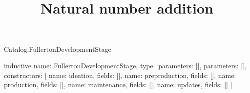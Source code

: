 \begin{lexlean}{Catalog.FullertonDevelopmentStage}
\title{Natural number addition}
\begin{semanticmodule}
inductive{
  name: FullertonDevelopmentStage,
  type_parameters: [],
  parameters: [],
  constructors: [
    {name: ideation, fields: []},
    {name: preproduction, fields: []},
    {name: production, fields: []},
    {name: maintenance, fields: []},
    {name: updates, fields: []}
  ]
}
\end{semanticmodule}
\end{lexlean}
